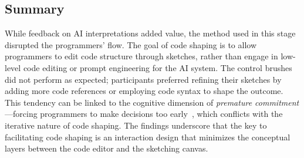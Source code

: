 
\subsection{Summary}
While feedback on AI interpretations added value, the method used in this stage disrupted the programmers' flow. The goal of code shaping is to allow programmers to edit code structure through sketches, rather than engage in low-level code editing or prompt engineering for the AI system. The control brushes did not perform as expected; participants preferred refining their sketches by adding more code references or employing code syntax to shape the outcome. This tendency can be linked to the cognitive dimension of \emph{premature commitment}---forcing programmers to make decisions too early~\cite{green1996usability}, which conflicts with the iterative nature of code shaping. The findings underscore that the key to facilitating code shaping is an interaction design that minimizes the conceptual layers between the code editor and the sketching canvas.

